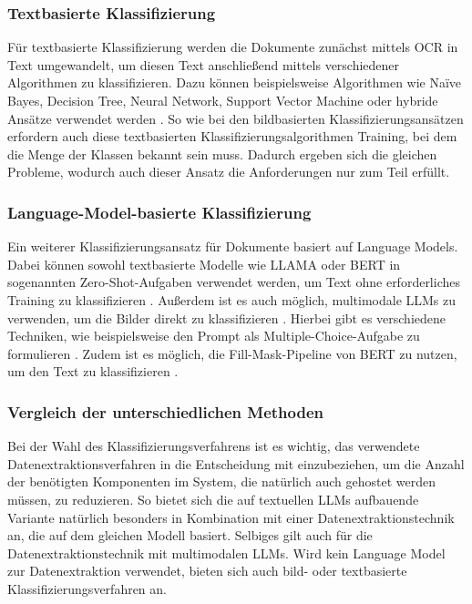 \subsubsection{Textbasierte Klassifizierung}
\label{subsubsec:text-basierte-klassifizierung}

Für textbasierte Klassifizierung werden die Dokumente zunächst mittels \gls{OCR} in Text umgewandelt, um diesen Text anschließend mittels verschiedener Algorithmen zu klassifizieren. Dazu können beispielsweise Algorithmen wie Naïve Bayes, Decision Tree, Neural Network, Support Vector Machine oder hybride Ansätze verwendet werden \cite{dalal2011automatic, RasjidZulfanyErlisa2017PCaO, YangYiming1999Arot}. So wie bei den bildbasierten Klassifizierungsansätzen erfordern auch diese textbasierten Klassifizierungsalgorithmen Training, bei dem die Menge der Klassen bekannt sein muss. Dadurch ergeben sich die gleichen Probleme, wodurch auch dieser Ansatz die Anforderungen nur zum Teil erfüllt.

\subsubsection{Language-Model-basierte Klassifizierung}
\label{subsubsec:language-model-basierte-klassifizierung}

Ein weiterer Klassifizierungsansatz für Dokumente basiert auf Language Models. Dabei können sowohl textbasierte Modelle wie LLAMA oder BERT in sogenannten Zero-Shot-Aufgaben verwendet werden, um Text ohne erforderliches Training zu klassifizieren \cite{PuriRaul2019ZTCW, bert_as_classifier_without_fine_tuning}. Außerdem ist es auch möglich, multimodale LLMs zu verwenden, um die Bilder direkt zu klassifizieren \cite{LiJunnan2023BBLP, CaffagniDavide2024WHRG}. Hierbei gibt es verschiedene Techniken, wie beispielsweise den Prompt als Multiple-Choice-Aufgabe zu formulieren \cite{PuriRaul2019ZTCW}. Zudem ist es möglich, die Fill-Mask-Pipeline von BERT zu nutzen, um den Text zu klassifizieren \cite{bert_as_classifier_without_fine_tuning}.

\subsubsection{Vergleich der unterschiedlichen Methoden}
\label{subsubsec:vergleich-der-unterschiedlichen-methoden}

Bei der Wahl des Klassifizierungsverfahrens ist es wichtig, das verwendete Datenextraktionsverfahren in die Entscheidung mit einzubeziehen, um die Anzahl der benötigten Komponenten im System, die natürlich auch gehostet werden müssen, zu reduzieren. So bietet sich die auf textuellen \glspl{LLM} aufbauende Variante natürlich besonders in Kombination mit einer Datenextraktionstechnik an, die auf dem gleichen Modell basiert. Selbiges gilt auch für die Datenextraktionstechnik mit multimodalen \glspl{LLM}. Wird kein Language Model zur Datenextraktion verwendet, bieten sich auch bild- oder textbasierte Klassifizierungsverfahren an.

